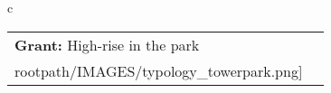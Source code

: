 \begin{table}[H]
        \begin{tabular}{c}
        \begin{tabular}{m{1.5in} m{2in}}
\textbf{Grant:} {High-rise in the park} & \texttt{[image: \\rootpath/IMAGES/typology\_towerpark.png]}
\end{tabular}\end{tabular}
        \end{table}